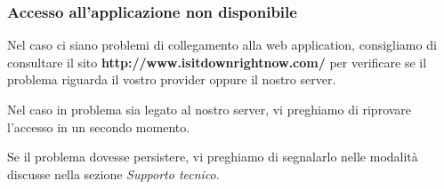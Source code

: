 \documentclass[../manuale-utente.tex]{subfiles}
\begin{document}
\subsubsection{Accesso all'applicazione non disponibile}
\label{subs:web_app_accesso_non_disponibile}

Nel caso ci siano problemi di collegamento alla web application, consigliamo di consultare il sito \textbf{http://www.isitdownrightnow.com/} per verificare se il problema riguarda il vostro provider oppure il nostro server.

Nel caso in problema sia legato al nostro server, vi preghiamo di riprovare l’accesso in un secondo momento.

Se il problema dovesse persistere, vi preghiamo di segnalarlo nelle modalità discusse nella sezione \textit{Supporto tecnico}.
\end{document}
